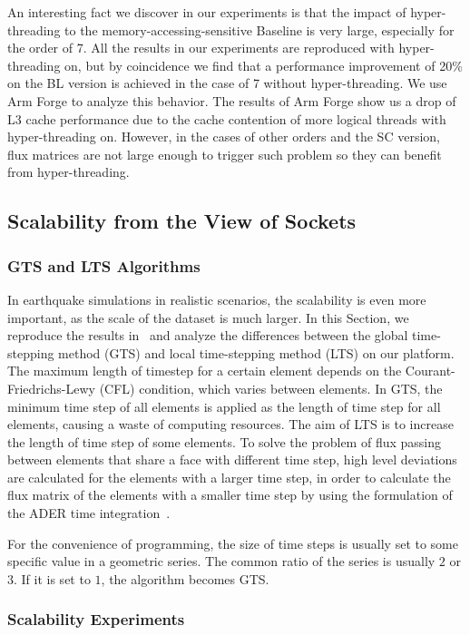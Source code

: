 \documentclass[5p,times]{sig-alternate-05-2015}
\begin{document}
An interesting fact we discover in our experiments is that the impact of hyper-threading to the memory-accessing-sensitive Baseline is very large, especially for the order of 7. All the results in our experiments are reproduced with hyper-threading on, but by coincidence we find that a performance improvement of 20\% on the BL version is achieved in the case of 7 without hyper-threading. We use Arm Forge to analyze this behavior. The results of Arm Forge show us a drop of L3 cache performance due to the cache contention of more logical threads with hyper-threading on. However, in the cases of other orders and the SC version, flux matrices are not large enough to trigger such problem so they can benefit from hyper-threading. 

\subsection{Scalability from the View of Sockets}

\subsubsection{GTS and LTS Algorithms}
In earthquake simulations in realistic scenarios, the scalability is even more important, as the scale of the dataset is much larger. In this Section, we reproduce the results in \OriginalPaper\ and analyze the differences between the global time-stepping method (GTS) and local time-stepping method (LTS) on our platform. The maximum length of timestep for a certain element depends on the Courant-Friedrichs-Lewy (CFL) condition, which varies between elements. In GTS, the minimum time step of all elements is applied as the length of time step for all elements, causing a waste of computing resources. The aim of LTS is to increase the length of time step of some elements. To solve the problem of flux passing between elements that share a face with different time step, high level deviations are calculated for the elements with a larger time step, in order to calculate the flux matrix of the elements with a smaller time step by using the formulation of the ADER time integration~\cite{LTS:7516082}. 

For the convenience of programming, the size of time steps is usually set to some specific value in a geometric series. The common ratio of the series is usually $2$ or $3$. If it is set to $1$, the algorithm becomes GTS.

\subsubsection{Scalability Experiments}
\end{document}
